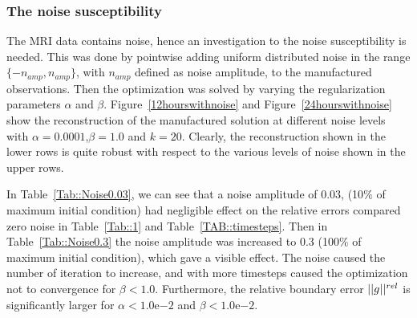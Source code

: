 \documentclass[11pt,a4paper]{article}
\begin{document}


\subsubsection{The noise susceptibility}
The MRI data contains noise, hence an investigation to the noise susceptibility is needed. This was done by pointwise adding uniform distributed noise in the range $\lbrace -n_{amp} , n_{amp} \rbrace $, with $n_{amp}$ defined as noise amplitude, to the manufactured observations. Then the optimization was solved by varying the regularization parameters $\alpha$ and $\beta$. Figure~\ref{12hourswithnoise} and Figure~\ref{24hourswithnoise} show the reconstruction of the manufactured solution at
different noise levels with $\alpha=0.0001$,$\beta=1.0$ and $k=20$. Clearly, the reconstruction shown in the lower rows is quite robust with respect to the various levels
of noise shown in the upper rows.      

In Table~\ref{Tab::Noise0.03}, we can see that a noise amplitude of 0.03, (10$\%$ of maximum initial condition) had negligible effect on the relative errors compared zero noise in Table~\ref{Tab::1} and Table~\ref{TAB::timesteps}. Then in Table~\ref{Tab::Noise0.3} the noise amplitude was increased to 0.3 (100$\%$ of maximum initial condition), which gave a visible effect. The noise caused the number of iteration to increase, and with more timesteps caused the optimization not to convergence for $\beta < 1.0$. Furthermore, the relative boundary error $||g||\sp{rel}$ is significantly larger for $\alpha< 1.0\mathrm{e}{-2} $ and $\beta < 1.0\mathrm{e}{-2}$.  
\end{document}
